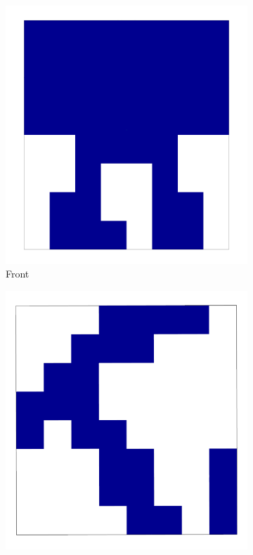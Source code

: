 \begin{figure}[!hb]
	\centering
	\hfill
	\begin{subfigure}{0.325\textwidth}
		\centering
		\includegraphics[width=\linewidth]{Figures/ObjRecog/binary_front}
		\caption{Front}
		\label{subfig:objrecog:binary_occ:front}
	\end{subfigure}
	\hfill
	\begin{subfigure}{0.325\textwidth}
		\centering
		\includegraphics[width=\linewidth]{Figures/ObjRecog/binary_side}

\end{subfigure}
\end{figure}
